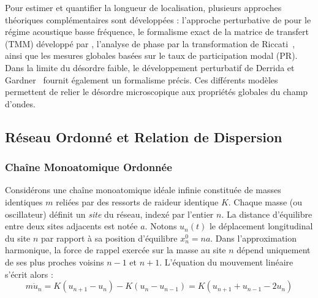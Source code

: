 \documentclass[11pt, a4paper, twoside]{article}
\begin{document}
Pour estimer et quantifier la longueur de localisation, plusieurs approches théoriques complémentaires sont développées : l'approche perturbative de \textcite{matsuda1970localization} pour le régime acoustique basse fréquence, le formalisme exact de la matrice de transfert (TMM) développé par \textcite{schmidt1957disordered}, l'analyse de phase par la transformation de Riccati~\cite{halperin1965properties}, ainsi que les mesures globales basées sur le taux de participation modal (PR). Dans la limite du désordre faible, le développement perturbatif de Derrida et Gardner~\cite{derrida1984lyapounov} fournit également un formalisme précis. Ces différents modèles permettent de relier le désordre microscopique aux propriétés globales du champ d'ondes.

\FloatBarrier
\subsection{Réseau Ordonné et Relation de Dispersion}

\subsubsection{Chaîne Monoatomique Ordonnée}
Considérons une chaîne monoatomique idéale infinie constituée de masses identiques $m$ reliées par des ressorts de raideur identique $K$. Chaque masse (ou oscillateur) définit un \textit{site} du réseau, indexé par l'entier $n$. La distance d'équilibre entre deux sites adjacents est notée $a$. Notons $u_n(t)$ le déplacement longitudinal du site $n$ par rapport à sa position d'équilibre $x_n^0 = n a$. Dans l'approximation harmonique, la force de rappel exercée sur la masse au site $n$ dépend uniquement de ses plus proches voisins $n-1$ et $n+1$. L'équation du mouvement linéaire s'écrit alors :
\begin{equation}\label{eq:eom_chain}
    m \ddot{u}_n = K(u_{n+1} - u_n) - K(u_n - u_{n-1}) = K(u_{n+1} + u_{n-1} - 2u_n)
\end{equation}
\end{document}
